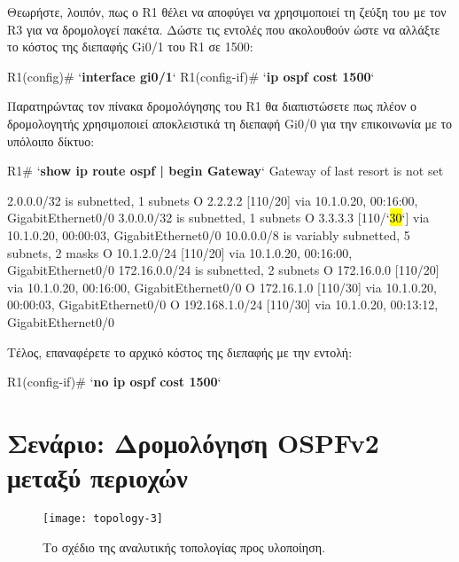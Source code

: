 \documentclass{EdipyLabs} %
\begin{document}
Θεωρήστε, λοιπόν, πως ο R1 θέλει να αποφύγει να χρησιμοποιεί τη ζεύξη του με τον R3 για να δρομολογεί πακέτα. Δώστε τις εντολές που ακολουθούν ώστε να αλλάξτε το κόστος της διεπαφής Gi0/1 του R1 σε 1500:

\begin{CommandBox}
R1(config)# `\textbf{interface gi0/1}`
R1(config-if)# `\textbf{ip ospf cost 1500}`
\end{CommandBox}

Παρατηρώντας τον πίνακα δρομολόγησης του R1 θα διαπιστώσετε πως πλέον ο δρομολογητής χρησιμοποιεί αποκλειστικά τη διεπαφή Gi0/0 για την επικοινωνία με το υπόλοιπο δίκτυο:

\begin{CommandBox}
R1# `\textbf{show ip route ospf | begin Gateway}`
Gateway of last resort is not set

      2.0.0.0/32 is subnetted, 1 subnets
O        2.2.2.2 [110/20] via 10.1.0.20, 00:16:00, GigabitEthernet0/0
      3.0.0.0/32 is subnetted, 1 subnets
O        3.3.3.3 [110/`\hl{30}`] via 10.1.0.20, 00:00:03, GigabitEthernet0/0
      10.0.0.0/8 is variably subnetted, 5 subnets, 2 masks
O        10.1.2.0/24 [110/20] via 10.1.0.20, 00:16:00, GigabitEthernet0/0
      172.16.0.0/24 is subnetted, 2 subnets
O        172.16.0.0 [110/20] via 10.1.0.20, 00:16:00, GigabitEthernet0/0
O        172.16.1.0 [110/30] via 10.1.0.20, 00:00:03, GigabitEthernet0/0
O     192.168.1.0/24 [110/30] via 10.1.0.20, 00:13:12, GigabitEthernet0/0
\end{CommandBox}\vspace*{0.25cm}

Τέλος, επαναφέρετε το αρχικό κόστος της διεπαφής με την εντολή:

\begin{CommandBox}
R1(config-if)# `\textbf{no ip ospf cost 1500}`
\end{CommandBox}

\newpage

\section{Σενάριο: Δρομολόγηση OSPFv2 μεταξύ περιοχών}

\begin{figure}[H]
	\centering
	\texttt{[image: topology-3]}
	\caption{Το σχέδιο της αναλυτικής τοπολογίας προς υλοποίηση.}\label{fig:topology3}
\end{figure}
\end{document}
